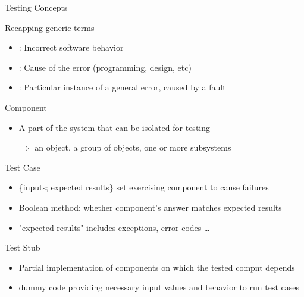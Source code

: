 \begin{frame}[squeeze]{Testing Concepts}
  \begin{block}{Recapping generic terms}
    \begin{itemize}\vspace{-.4\baselineskip}
    \item {}: Incorrect software behavior
    \item {}: Cause of the error (programming, design, etc)
    \item {}: Particular instance of a general error, caused
      by a fault 
    \end{itemize}
  \end{block}\vspace{-.6\baselineskip}

  \begin{block}{Component}
    \begin{itemize}\vspace{-.4\baselineskip}
    \item A part of the system that can be isolated for testing  
    \item[$\Rightarrow$] an object, a group of objects, one or more subsystems
    \end{itemize}
  \end{block}\vspace{-.6\baselineskip}


  \begin{block}{Test Case}
    \begin{itemize}\vspace{-.4\baselineskip}
    \item \{inputs; expected results\} set exercising component to cause
      failures 
    \item Boolean method: whether component's answer matches expected results
    \item "expected results" includes exceptions, error codes \ldots
    \end{itemize}
  \end{block}\vspace{-.6\baselineskip}
         
  \begin{block}{Test Stub}
    \begin{itemize}\vspace{-.4\baselineskip}
    \item Partial implementation of components on which the tested compnt
      depends
    \item dummy code providing necessary input values and behavior to run test
      cases
    \end{itemize}
  \end{block}\vspace{-.6\baselineskip}


\end{frame}
